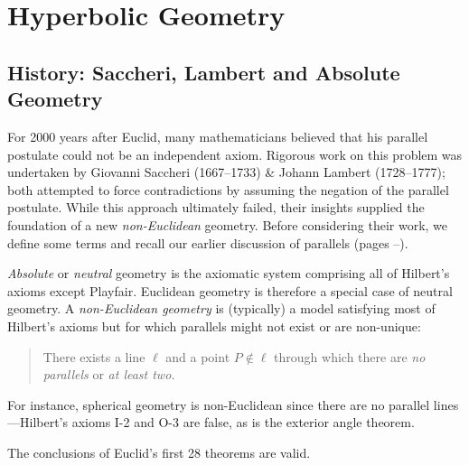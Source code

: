 \graphicspath{{4hyper/asy/}}


\section{Hyperbolic Geometry}\label{chap:hyper}

\subsection{History: Saccheri, Lambert and Absolute Geometry}\label{sec:hyp1}

For 2000 years after Euclid, many mathematicians believed that his parallel postulate could not be an independent axiom. Rigorous work on this problem was undertaken by Giovanni Saccheri (1667--1733) \& Johann Lambert (1728--1777); both attempted to force contradictions by assuming the negation of the parallel postulate. While this approach ultimately failed, their insights supplied the foundation of a new \emph{non-Euclidean} geometry. Before considering their work, we define some terms and recall our earlier discussion of parallels (pages \pageref{pg:parallelexist}--\pageref*{pg:pythagoras}).

\begin{defn}{}{}
	\emph{Absolute} or \emph{neutral} geometry is the axiomatic system comprising all of Hilbert's axioms except Playfair. Euclidean geometry is therefore a special case of neutral geometry.\smallbreak
	A \emph{non-Euclidean geometry} is (typically) a model satisfying most of Hilbert's axioms but for which parallels might not exist or are non-unique:
	\begin{quote}
		There exists a line $\ell$ and a point $P\not\in\ell$ through which there are \emph{no parallels} or \emph{at least two.}
	\end{quote}
\end{defn}

For instance, spherical geometry is non-Euclidean since there are no parallel lines---Hilbert's axioms I-2 and O-3 are false, as is the exterior angle theorem.



The conclusions of Euclid's first 28 theorems are valid.

